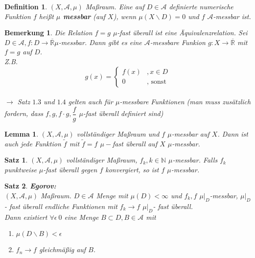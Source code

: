 \documentclass[11pt]{memoir}
\theoremstyle{changebreak}
\newtheorem{Definition}{Definition}[chapter]
\newtheorem{Bemerkung}{Bemerkung}[chapter]
\newtheorem{Lemma}{Lemma}[chapter]
\newtheorem{Satz}{Satz}[chapter]
\begin{document}
\begin{Definition}
$(X, \mathscr A, \mu)$ Maßraum. Eine auf $D \in \mathscr A$ definierte numerische Funktion $f$ heißt \textbf{$\mu$ messbar} (auf $X$), wenn $\mu(X \backslash D) = 0$ und $f$ $\mathscr A$-messbar ist.
\end{Definition}

\begin{Bemerkung}
Die Relation $f = g$ $\mu$-fast überall ist eine Äquivalenzrelation. Sei $D \in \mathscr A, f: D \rightarrow \overline{\mathbb R} \mu$-messbar. Dann gibt es eine $\mathscr A$-messbare Funkion $g: X \rightarrow \overline{\mathbb R}$ mit $f = g$ auf $D$. \\
\emph{Z.B.} \\
\begin{equation}
	g(x) =
	\begin{cases}
		f(x) & , x \in D \\
		0 & \text{, sonst}
	\end{cases}
\end{equation} \\
$\rightarrow$ Satz $1.3$ und $1.4$ gelten auch für $\mu$-messbare Funktionen (man muss zusätzlich fordern, dass $f, g, f \cdotp g, \dfrac{f}{g}$ $ \mu$-fast überall definiert sind)
\end{Bemerkung}


\begin{Lemma}
$(X, \mathscr A, \mu)$ vollständiger Maßraum und $f$ $\mu$-messbar auf $X$. Dann ist auch jede Funktion $\tilde f$ mit $\tilde f = f$ $\mu-$fast überall auf $X$ $\mu$-messbar.
\end{Lemma}


\begin{Satz}
$(X, \mathscr A, \mu)$ vollständiger Maßraum, $f_k, k \in \mathbb N$ $\mu$-messbar. Falls $f_k$ punktweise $\mu$-fast überall gegen $f$ konvergiert, so ist $f$ $\mu$-messbar.
\end{Satz}

\begin{Satz}{\emph{\textbf{Egorov:}}} \\
$(X, \mathscr A, \mu)$ Maßraum. $D \in \mathscr A$ Menge mit $\mu(D) \less \infty$ und $f_k, f$ $ \mu|_D$-messbar, $\mu|_D$ - fast überall endliche Funktionen mit $f_k \rightarrow f$ $\mu|_D$- fast überall. \\
Dann existiert $\forall \epsilon \> 0$ eine Menge $B \subset D, B \in \mathscr A$ mit \\
\begin{enumerate}
	\item $\mu(D\backslash B) \less \epsilon$
	\item $f_n \rightarrow f$ gleichmäßig auf $B$.
\end{enumerate}
\end{Satz}
\end{document}

